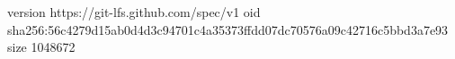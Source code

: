 version https://git-lfs.github.com/spec/v1
oid sha256:56c4279d15ab0d4d3c94701c4a35373ffdd07dc70576a09c42716c5bbd3a7e93
size 1048672
